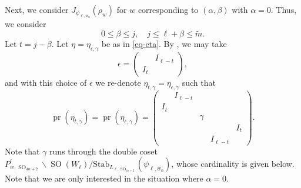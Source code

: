 \documentclass[12pt]{amsart}
\newcommand{\wt}{\widetilde}
\theoremstyle{remark}
\newcommand{\pr}{\operatorname{pr}}
\DeclareMathOperator{\SO}{SO}
\begin{document}
Next, we consider $J_{\psi_{\ell, w_0}}(\rho_w)$ for $w$ corresponding to $(\alpha, \beta)$ with $\alpha=0$. Thus, we consider
\begin{equation}
\label{eq-local-Jacquet-module-inequalities}
0\le \beta\le j, \quad j\le \ell+\beta\le \wt m.	
\end{equation}
Let $t=j-\beta$. 
 Let $\eta=\eta_{\epsilon, \gamma}$ be as in \eqref{eq-eta}. By \cite[Lemma 5.1]{GinzburgRallisSoudry2011}, we may take 
\begin{equation}
\label{eq-epsilon}
\epsilon=\begin{pmatrix}
& I_{\ell-t}\\
I_{t} &	
\end{pmatrix},
\end{equation}
and with this choice of $\epsilon$ we re-denote $\eta_{t,\gamma} =\eta_{\epsilon, \gamma}$ such that
\begin{equation}
\label{eq-eta-2}
\pr(\eta_{t,\gamma}) =\pr(\eta_{\epsilon, \gamma}) =  \left( \begin{smallmatrix}
 & I_{\ell-t} & & &\\ I_t &&&&\\ & & \gamma &&\\ && && I_t \\ &&&I_{\ell-t} &	
 \end{smallmatrix} \right).
 \end{equation}
Note that $\gamma$ runs through the double coset $P_{w,\SO_{4n+2}}^\prime\backslash \SO(W_{\ell}) / \mathrm{Stab}_{L_{\ell,\SO_{4n+2}}}(\psi_{\ell, w_0})$, whose cardinality is given below. Note that we are only interested in the situation where $\alpha=0$.
\end{document}
